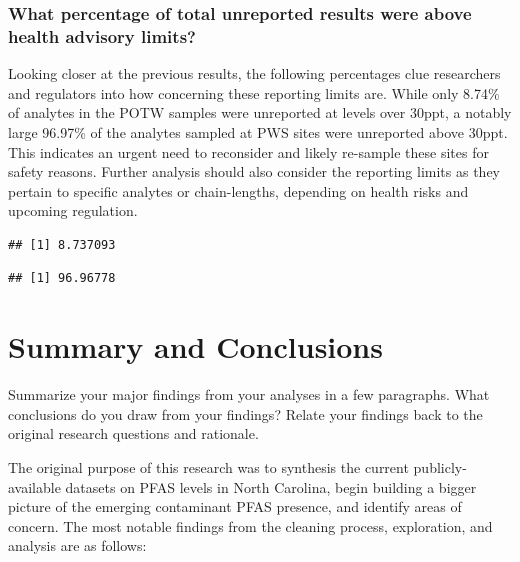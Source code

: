 \documentclass[
  12pt,
]{article}
\begin{document}
\hypertarget{what-percentage-of-total-unreported-results-were-above-health-advisory-limits}{%
\subsubsection{What percentage of total unreported results were above
health advisory
limits?}\label{what-percentage-of-total-unreported-results-were-above-health-advisory-limits}}

Looking closer at the previous results, the following percentages clue
researchers and regulators into how concerning these reporting limits
are. While only 8.74\% of analytes in the POTW samples were unreported
at levels over 30ppt, a notably large 96.97\% of the analytes sampled at
PWS sites were unreported above 30ppt. This indicates an urgent need to
reconsider and likely re-sample these sites for safety reasons. Further
analysis should also consider the reporting limits as they pertain to
specific analytes or chain-lengths, depending on health risks and
upcoming regulation.

\begin{verbatim}
## [1] 8.737093
\end{verbatim}

\begin{verbatim}
## [1] 96.96778
\end{verbatim}

\newpage

\hypertarget{summary-and-conclusions}{%
\section{Summary and Conclusions}\label{summary-and-conclusions}}

Summarize your major findings from your analyses in a few paragraphs.
What conclusions do you draw from your findings? Relate your findings
back to the original research questions and rationale.

The original purpose of this research was to synthesis the current
publicly-available datasets on PFAS levels in North Carolina, begin
building a bigger picture of the emerging contaminant PFAS presence, and
identify areas of concern. The most notable findings from the cleaning
process, exploration, and analysis are as follows:
\end{document}
